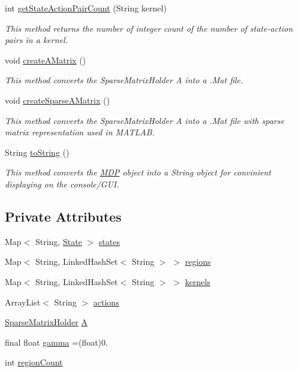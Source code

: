 \begin{DoxyCompactItemize}
int \hyperlink{classmdp_1_1core_1_1_m_d_p_a597956fa2391fdd8ff1a3266d5e48688}{get\+State\+Action\+Pair\+Count} (String kernel)
\begin{DoxyCompactList}\small\item\em This method returns the number of integer count of the number of state-\/action pairs in a kernel. \end{DoxyCompactList}\item 
void \hyperlink{classmdp_1_1core_1_1_m_d_p_aab4fc6ad8c299f88d6619cfd059b3931}{create\+A\+Matrix} ()
\begin{DoxyCompactList}\small\item\em This method converts the Sparse\+Matrix\+Holder A into a .Mat file. \end{DoxyCompactList}\item 
void \hyperlink{classmdp_1_1core_1_1_m_d_p_ab378c6028d8b83259ee5f630736d183e}{create\+Sparse\+A\+Matrix} ()
\begin{DoxyCompactList}\small\item\em This method converts the Sparse\+Matrix\+Holder A into a .Mat file with sparse matrix representation used in M\+A\+T\+L\+A\+B. \end{DoxyCompactList}\item 
String \hyperlink{classmdp_1_1core_1_1_m_d_p_aeeeba49692fd6972b6833f511e07621b}{to\+String} ()
\begin{DoxyCompactList}\small\item\em This method converts the \hyperlink{classmdp_1_1core_1_1_m_d_p}{M\+D\+P} object into a String object for convinient displaying on the console/\+G\+U\+I. \end{DoxyCompactList}\end{DoxyCompactItemize}
\subsection*{Private Attributes}
\begin{DoxyCompactItemize}
\item 
Map$<$ String, \hyperlink{classmdp_1_1core_1_1_state}{State} $>$ \hyperlink{classmdp_1_1core_1_1_m_d_p_a62bf7674d88162db7d00cfd82603b24f}{states}
\item 
Map$<$ String, Linked\+Hash\+Set$<$ String $>$ $>$ \hyperlink{classmdp_1_1core_1_1_m_d_p_a79761e7b3bb0d7a083bee7183c992893}{regions}
\item 
Map$<$ String, Linked\+Hash\+Set$<$ String $>$ $>$ \hyperlink{classmdp_1_1core_1_1_m_d_p_ac185a95b0c9eb78b9d5a00b214696191}{kernels}
\item 
Array\+List$<$ String $>$ \hyperlink{classmdp_1_1core_1_1_m_d_p_a9da06680f73a486a6ee65c8208151e70}{actions}
\item 
\hyperlink{classmdp_1_1util_1_1_sparse_matrix_holder}{Sparse\+Matrix\+Holder} \hyperlink{classmdp_1_1core_1_1_m_d_p_ac75a611d9f5186893b70b8072bfa0804}{A}
\item 
final float \hyperlink{classmdp_1_1core_1_1_m_d_p_ab240c1d97d39d6f66cff0c8d06a57a69}{gamma} =(float)0.
\item 
int \hyperlink{classmdp_1_1core_1_1_m_d_p_ae2644b9387e09a5c2ab096c0bb519f8d}{region\+Count}
\end{DoxyCompactItemize}



